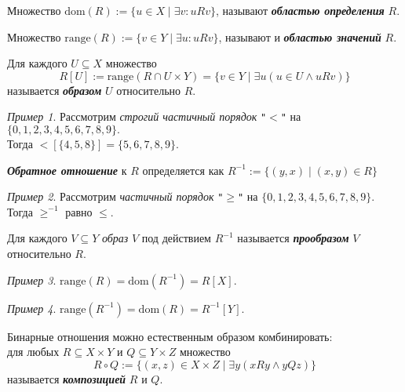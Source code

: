 \documentclass{article}
\newcommand{\range}{\mathrm{range}}
\newcommand{\dom}{\mathrm{dom}}
\theoremstyle{remark}
\newtheorem{example}{Пример}
\begin{document}
\begin{definition}
	Множество
	$\mathrm{dom}(R):=\{u\in X\mid\exists v: uRv\}$,
	называют \textit{\textbf{областью определения}} $R$.
\end{definition}

\begin{definition}
	Множество
	$\mathrm{range}(R) := \{v\in Y\mid\exists u: uRv\}$,
	называют и \textit{\textbf{областью значений}} $R$.
\end{definition}

\begin{definition}
	Для каждого $U \subseteq X$ множество
	$$R[U] := \mathrm{range}(R\cap U\times Y) = \{v \in Y  \mid \exists u(u\in U\wedge uRv)\}$$ называется \textit{\textbf{образом}} $U$ относительно $R$.
\end{definition}

\begin{example}
	Рассмотрим \textit{строгий частичный порядок} \texttt{"$<$"} на $\{0,1,2,3,4,5,6,7,8,9\}.$\\
	Тогда $<[\{4,5,8\}] = \{5,6,7,8,9\}.$
\end{example}

\begin{definition}
	\textit{\textbf{Обратное отношение}} к $R$ определяется как
	$R^{-1} := \{(y,x) \mid (x,y) \in R\}$
\end{definition}

\begin{example}
Рассмотрим \textit{частичный порядок} \texttt{"$\geqslant$"} на $\{0,1,2,3,4,5,6,7,8,9\}.$\\
Тогда $\geqslant^{-1}$ равно $\leqslant.$
\end{example}

\begin{definition}
	Для каждого $V \subseteq Y$ \textit{образ} $V$ под действием $R^{-1}$ называется \textbf{\textit{прообразом}} $V$ относительно $R$.
\end{definition}

\begin{example}
	$\range(R) = \dom(R^{-1}) = R [X].$
\end{example}
\begin{example}
	$\range(R^{-1}) =\dom(R) = R^{-1}[Y].$
\end{example}

\begin{definition}
	Бинарные отношения можно естественным образом комбинировать: \\
	для любых $R \subseteq X \times Y$ и $Q \subseteq Y \times Z$ множество
	$$R\circ Q := \{(x,z) \in X\times Z\mid \exists y(xRy \wedge yQz)\}$$
	называется \textbf{\textit{композицией}} $R$ и $Q$.
\end{definition}
\end{document}
